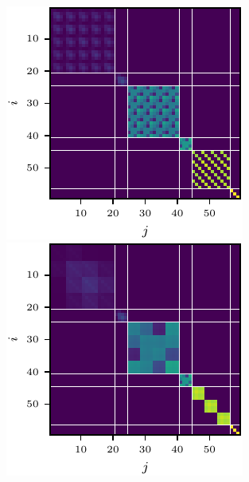 \begin{figure}
\begin{minipage}[t]{0.495\linewidth}
  \end{minipage}
  \\
  \begin{minipage}[t]{0.495\linewidth}
    \centering
    \includegraphics[width=\linewidth]{../kfs/plots/synthetic_cvec_ggn_bda.pdf}
  \end{minipage}
  \hfill
  \begin{minipage}[t]{0.495\linewidth}
    \centering
    \includegraphics[width=\linewidth]{../kfs/plots/synthetic_rvec_ggn_bda.pdf}

\end{minipage}
\end{figure}
